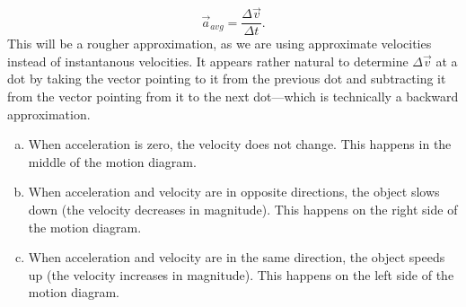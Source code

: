 \documentclass[]{article}
\begin{document}
\begin{TeacherMargin}
\[\vec{a}_{avg} = \frac{\Delta\vec{v}}{\Delta t}.
\]
This will be a rougher approximation, as we are using approximate velocities instead of instantanous velocities. It appears rather natural to determine $\Delta\vec{v}$ at a dot by taking the vector pointing to it from the previous dot and subtracting it from the vector pointing from it to the next dot---which is technically a backward approximation.
\begin{center}
\end{center}
\begin{enumerate}[(a)]
	\item When acceleration is zero, the velocity does not change. This happens in the middle of the motion diagram.
	\item When acceleration and velocity are in opposite directions, the object slows down (the velocity decreases in magnitude). This happens on the right side of the motion diagram.
	\item When acceleration and velocity are in the same direction, the object speeds up (the velocity increases in magnitude). This happens on the left side of the motion diagram.
\end{enumerate}

\end{TeacherMargin}
\end{document}
